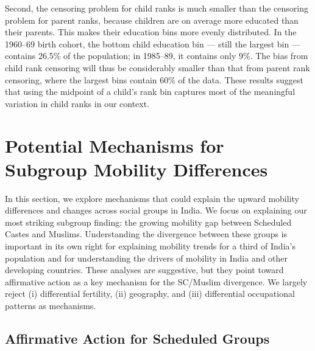 \documentclass[12pt,letterpaper]{article}
\numberwithin{equation}{section}
\begin{document}
Second, the censoring problem for child ranks is much smaller than the censoring problem for parent ranks, because children are on average more educated than their parents. This makes their education bins more evenly distributed. In the 1960--69 birth cohort, the bottom child education bin --- still the largest bin --- contains 26.5\% of the population; in 1985--89, it contains only 9\%. The bias from child rank censoring will thus be considerably smaller than that from parent rank censoring, where the largest bins contain 60\% of the data.
% 
% 
These results suggest that using the midpoint of a child's rank bin captures most of the meaningful variation in child ranks in our context.

\section{Potential Mechanisms for Subgroup Mobility Differences}
\label{sec:mech}

In this section, we explore mechanisms that could explain the upward mobility differences and changes across social groups in India. We focus on explaining our most striking subgroup finding: the growing mobility gap between Scheduled Castes and Muslims. Understanding the divergence between these groups is important in its own right for explaining mobility trends for a third of India's population and for understanding the drivers of mobility in India and other developing countries. These analyses are suggestive, but they point toward affirmative action as a key mechanism for the SC/Muslim divergence. We largely reject (i) differential fertility, (ii) geography, and (iii) differential occupational patterns as mechanisms.

\subsection{Affirmative Action for Scheduled Groups}
\label{sec:cassan}
\end{document}
